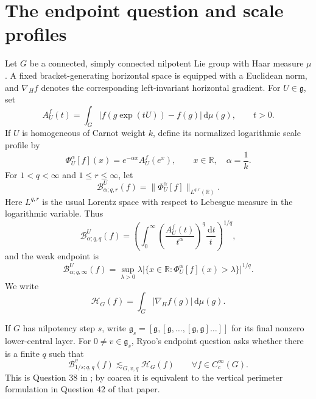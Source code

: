 \documentclass[11pt]{article}
\theoremstyle{definition}
\theoremstyle{remark}
\newcommand{\R}{\mathbb R}
\newcommand{\g}{\mathfrak g}
\newcommand{\dd}{\,\mathrm d}
\newcommand{\abs}[1]{\lvert #1\rvert}
\newcommand{\norm}[1]{\lVert #1\rVert}
\newcommand{\A}[2]{A_{#1}^{#2}}
\newcommand{\HH}{\mathcal H}
\newcommand{\B}[4]{\mathcal B^{#1}_{#2;#3,#4}}
\newcommand{\Bw}[3]{\mathcal B^{#1}_{#2;#3,\infty}}
\newcommand{\prof}[3]{\Phi^{#1}_{#2}[#3]}
\newcommand{\less}{\lesssim}
\begin{document}
\tableofcontents

\section{The endpoint question and scale profiles}

Let \(G\) be a connected, simply connected nilpotent Lie group with Haar measure
\(\mu\).  A fixed bracket-generating horizontal space is equipped with a Euclidean norm,
and \(\nabla_H f\) denotes the corresponding left-invariant horizontal gradient.  For
\(U\in\g\), set
\begin{equation}\label{eq:Adef}
 \A{U}{f}(t)=\int_G\abs{f(g\exp(tU))-f(g)}\dd\mu(g),\qquad t>0.
\end{equation}
If \(U\) is homogeneous of Carnot weight \(k\), define its normalized logarithmic scale
profile by
\begin{equation}\label{eq:profile}
 \prof{\alpha}{U}{f}(x)=e^{-\alpha x}\A{U}{f}(e^x),\qquad x\in\R,
 \quad \alpha=\frac1k.
\end{equation}
For \(1<q<\infty\) and \(1\le r\le\infty\), let
\begin{equation}\label{eq:LorentzBesov}
 \B{U}{\alpha}{q}{r}(f)=
 \norm{\prof{\alpha}{U}{f}}_{L^{q,r}(\R)}.
\end{equation}
Here \(L^{q,r}\) is the usual Lorentz space with respect to Lebesgue measure in the
logarithmic variable.  Thus
\[
 \B{U}{\alpha}{q}{q}(f)=
 \left(\int_0^\infty
 \left(\frac{\A{U}{f}(t)}{t^\alpha}\right)^q\frac{\dd t}{t}
 \right)^{1/q},
\]
and the weak endpoint is
\begin{equation}\label{eq:weakdef}
 \Bw{U}{\alpha}{q}(f)=
 \sup_{\lambda>0}\lambda
 \abs{\{x\in\R:\prof{\alpha}{U}{f}(x)>\lambda\}}^{1/q}.
\end{equation}
We write
\begin{equation}\label{eq:Hdef}
 \HH_G(f)=\int_G\abs{\nabla_Hf(g)}\dd\mu(g).
\end{equation}

If \(G\) has nilpotency step \(s\), write \(\g_s=[\g,[\g,\ldots,[\g,\g]\ldots]]\)
for its final nonzero lower-central layer.  For \(0\ne v\in\g_s\), Ryoo's endpoint
question asks whether there is a finite \(q\) such that
\begin{equation}\label{eq:Ryoo}
 \B{v}{1/s}{q}{q}(f)\less_{G,v,q}\HH_G(f)
 \qquad\forall f\in C_c^\infty(G).
\end{equation}
This is Question 38 in \cite{Ryoo2026}; by coarea it is equivalent to the vertical
perimeter formulation in Question 42 of that paper.
\end{document}

